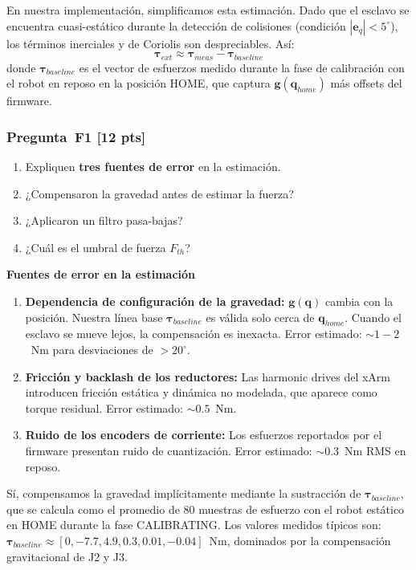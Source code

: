 \documentclass[journal,10pt,twoside]{IEEEtran}
\newcommand{\pts}[1]{\textcolor{tec_red}{\textbf{[#1 pts]}}}
\begin{document}
En nuestra implementación, simplificamos esta estimación. Dado que el
esclavo se encuentra cuasi-estático durante la detección de colisiones
(condición $|\bm{e}_q|<5^\circ$), los términos inerciales y de Coriolis
son despreciables. Así:
\begin{equation}
  \bm{\tau}_{ext} \approx \bm{\tau}_{meas} - \bm{\tau}_{baseline}
  \label{eq:our_estimate}
\end{equation}
donde $\bm{\tau}_{baseline}$ es el vector de esfuerzos medido durante
la fase de calibración con el robot en reposo en la posición HOME,
que captura $\bm{g}(\bm{q}_{home})$ más offsets del firmware.

\subsubsection*{Pregunta~F1 \pts{12}}
\begin{enumerate}[label=(\alph*)]
  \item Expliquen \textbf{tres fuentes de error} en la estimación.
  \item ¿Compensaron la gravedad antes de estimar la fuerza?
  \item ¿Aplicaron un filtro pasa-bajas?
  \item ¿Cuál es el umbral de fuerza $F_{th}$?
\end{enumerate}

\textbf{Fuentes de error en la estimación}
\begin{enumerate}
  \item \textbf{Dependencia de configuración de la gravedad:}
        $\bm{g}(\bm{q})$ cambia con la posición. Nuestra línea base
        $\bm{\tau}_{baseline}$ es válida solo cerca de $\bm{q}_{home}$.
        Cuando el esclavo se mueve lejos, la compensación es inexacta.
        Error estimado: $\sim1{-}2$~Nm para desviaciones de $>20^\circ$.
  \item \textbf{Fricción y backlash de los reductores:}
        Las harmonic drives del xArm introducen fricción estática y
        dinámica no modelada, que aparece como torque residual.
        Error estimado: $\sim0{.}5$~Nm.
  \item \textbf{Ruido de los encoders de corriente:}
        Los esfuerzos reportados por el firmware presentan ruido de
        cuantización. Error estimado: $\sim0{.}3$~Nm RMS en reposo.
\end{enumerate}

Sí, compensamos la gravedad implícitamente mediante la
sustracción de $\bm{\tau}_{baseline}$, que se calcula como el promedio
de 80 muestras de esfuerzo con el robot estático en HOME durante la
fase CALIBRATING. Los valores medidos típicos son:
$\bm{\tau}_{baseline}\approx[0, -7{.}7, 4{.}9, 0{.}3, 0{.}01, -0{.}04]$~Nm,
dominados por la compensación gravitacional de J2 y J3.
\end{document}
